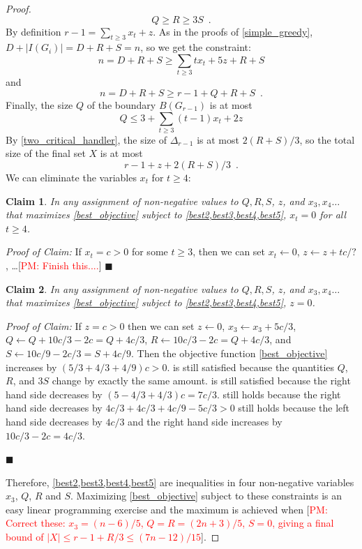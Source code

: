 \documentclass[12pt]{article}
\newtheorem{clm}{Claim}
\newenvironment{clmproof}{\noindent\emph{Proof of Claim:}}{\hfill{$\blacksquare$}\par}
\theoremstyle{definition}
\newcommand{\pat}[1]{[\textcolor{red}{PM: #1}]}
\begin{document}
\begin{proof}
  \begin{equation}
    Q \ge R \ge 3S \enspace . \label{best2}
  \end{equation}
  By definition $r-1 = \sum_{t\ge 3}x_t+z$.
  As in the proofs of \cref{simple_greedy}, $D+|I(G_i)|=D+R+S=n$, so we get the constraint:
  \begin{equation}
    n = D+R+S \ge \sum_{t\ge 3} tx_t + 5z + R + S \label{best3}
  \end{equation}
  and
  \begin{equation}
    n = D+R+S \ge r-1 + Q + R + S \enspace . \label{best4}
  \end{equation}
  Finally, the size $Q$ of the boundary $B(G_{r-1})$ is at most
  \begin{equation}
    Q \le 3 + \sum_{t\ge 3}(t-1)x_t + 2z \label{best5}
  \end{equation}
  By \cref{two_critical_handler}, the size of $\Delta_{r-1}$ is at most $2(R+S)/3$, so the total size of the final set $X$ is at most
  \begin{equation}
    r-1 + z + 2(R + S)/3 \enspace .  \label{best_objective}
  \end{equation}
  We can eliminate the variables $x_t$ for $t\ge 4$:
  \begin{clm}
    In any assignment of non-negative values to $Q, R, S$, $z$, and $x_3,x_4\ldots$ that maximizes \cref{best_objective} subject to \cref{best2,best3,best4,best5}, $x_t=0$ for all $t\ge 4$.
  \end{clm}
  \begin{clmproof}
     If $x_t = c >0$ for some $t\ge 3$, then we can set $x_t\gets 0$, $z\gets z+tc/?$, \ldots \pat{Finish this....}
  \end{clmproof}
  \begin{clm}
    In any assignment of non-negative values to $Q, R, S$, $z$, and $x_3,x_4\ldots$ that maximizes \cref{best_objective} subject to \cref{best2,best3,best4,best5}, $z=0$.
  \end{clm}
  \begin{clmproof}
    If $z = c >0$  then we can set $z\gets 0$, $x_3\gets x_3+5c/3$, $Q\gets Q+10c/3-2c=Q+4c/3$, $R\gets 10c/3-2c=Q+4c/3$, and $S\gets 10c/9-2c/3=S+4c/9$. Then the objective function \cref{best_objective} increases by $(5/3+4/3+4/9)c >0$.   is still satisfied because the quantities $Q$, $R$, and $3S$ change by exactly the same amount.   is still satisfied because the right hand side decreases by $(5-4/3+4/3)c=7c/3$.  still holds because the right hand side decreases by $4c/3 + 4c/3 +4c/9 - 5c/3>0$   still holds because the left hand side decreases by $4c/3$ and the right hand side increases by $10c/3 - 2c=4c/3$.

  \end{clmproof}
  Therefore, \cref{best2,best3,best4,best5} are inequalities in four non-negative variables $x_3$, $Q$, $R$ and $S$.  Maximizing \cref{best_objective} subject to these constraints is an easy linear programming exercise and the maximum is achieved when \pat{Correct these: $x_3=(n-6)/5$, $Q=R=(2n+3)/5$, $S=0$, giving a final bound of $|X|\le r-1+R/3\le (7n-12)/15$}.
\end{proof}
\end{document}
